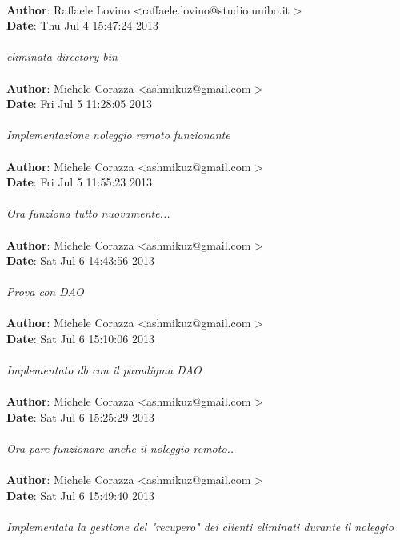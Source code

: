 \documentclass[a4paper,12pt]{article} %
\begin{document}
\\
\textbf{Author}: Raffaele Lovino \textless raffaele.lovino@studio.unibo.it \textgreater \\
\textbf{Date}:   Thu Jul 4 15:47:24 2013 \\
\\
    \emph{eliminata directory bin}\\
\\
\textbf{Author}: Michele Corazza \textless ashmikuz@gmail.com \textgreater \\
\textbf{Date}:   Fri Jul 5 11:28:05 2013 \\
\\
    \emph{Implementazione noleggio remoto funzionante}\\
\\
\textbf{Author}: Michele Corazza \textless ashmikuz@gmail.com \textgreater \\
\textbf{Date}:   Fri Jul 5 11:55:23 2013 \\
\\
    \emph{Ora funziona tutto nuovamente...}\\
\\
\textbf{Author}: Michele Corazza \textless ashmikuz@gmail.com \textgreater \\
\textbf{Date}:   Sat Jul 6 14:43:56 2013 \\
\\
    \emph{Prova con DAO}\\
\\
\textbf{Author}: Michele Corazza \textless ashmikuz@gmail.com \textgreater \\
\textbf{Date}:   Sat Jul 6 15:10:06 2013 \\
\\
    \emph{Implementato db con il paradigma DAO}\\
\\
\textbf{Author}: Michele Corazza \textless ashmikuz@gmail.com \textgreater \\
\textbf{Date}:   Sat Jul 6 15:25:29 2013 \\
\\
    \emph{Ora pare funzionare anche il noleggio remoto..}\\
\\
\textbf{Author}: Michele Corazza \textless ashmikuz@gmail.com \textgreater \\
\textbf{Date}:   Sat Jul 6 15:49:40 2013 \\
\\
    \emph{Implementata la gestione del "recupero" dei clienti eliminati durante il noleggio}\\
\end{document}
